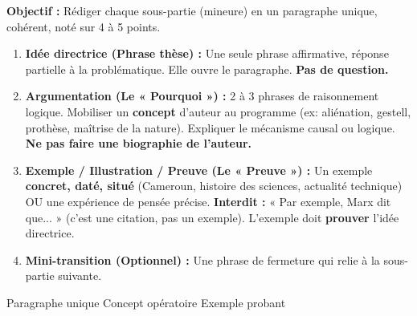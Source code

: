 \documentclass[11pt]{article}
\newcommand{\cle}[1]{{\popxbold\color{popdark}#1}}
\begin{document}
\begin{methode}
\textbf{Objectif :} Rédiger chaque sous-partie (mineure) en un paragraphe unique, cohérent, noté sur 4 à 5 points.
\begin{enumerate}
    \item \textbf{Idée directrice (Phrase thèse) :} Une seule phrase affirmative, réponse partielle à la problématique. Elle ouvre le paragraphe. \textbf{Pas de question.}
    \item \textbf{Argumentation (Le « Pourquoi ») :} 2 à 3 phrases de raisonnement logique. Mobiliser un \textbf{concept} d'auteur au programme (ex: \cle{aliénation}, \cle{gestell}, \cle{prothèse}, \cle{maîtrise de la nature}). Expliquer le mécanisme causal ou logique. \textbf{Ne pas faire une biographie de l'auteur.}
    \item \textbf{Exemple / Illustration / Preuve (Le « Preuve ») :} Un exemple \textbf{concret, daté, situé} (Cameroun, histoire des sciences, actualité technique) OU une expérience de pensée précise. \textbf{Interdit :} « Par exemple, Marx dit que... » (c'est une citation, pas un exemple). L'exemple doit \textbf{prouver} l'idée directrice.
    \item \textbf{Mini-transition (Optionnel) :} Une phrase de fermeture qui relie à la sous-partie suivante.
\end{enumerate}
\cle{Paragraphe unique} \cle{Concept opératoire} \cle{Exemple probant}
\end{methode}
\end{document}
